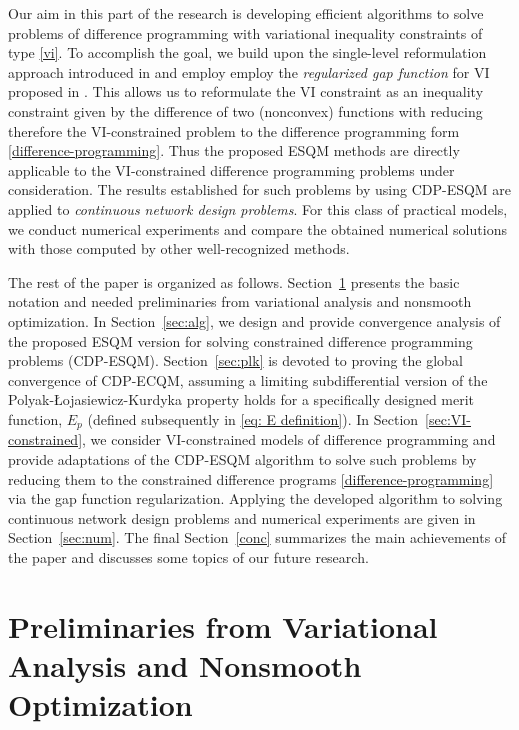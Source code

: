 \documentclass[11pt,a4paper]{article}
\theoremstyle{plain}
\begin{document}
Our aim in this part of the research is developing efficient algorithms to solve problems of difference programming with variational inequality constraints of type \eqref{vi}. To accomplish the goal, 
we build upon the single-level reformulation approach introduced in \cite{marcotte1996exact} and employ employ the {\em regularized gap function} for VI proposed in \cite{fukushima1992equivalent}.
This allows us to reformulate the VI constraint as an inequality constraint given by the difference of two (nonconvex) functions with reducing therefore the VI-constrained problem to the difference programming form \eqref{difference-programming}. Thus the proposed ESQM methods are directly applicable to the VI-constrained difference programming problems under consideration. The results established for such problems by using CDP-ESQM are applied to {\em continuous network design problems}. For this class of practical models, we conduct numerical experiments and compare the obtained numerical solutions with those computed by other well-recognized methods.\vspace*{0.03in}

The rest of the paper is organized as follows. 
Section~\ref{sec:preliminaries} presents the basic notation and needed preliminaries from variational analysis and nonsmooth optimization. In Section~\ref{sec:alg}, we design and provide convergence analysis of the proposed ESQM version for solving constrained difference programming problems (CDP-ESQM). Section~\ref{sec:plk} is devoted to proving the global convergence of CDP-ECQM, assuming a limiting subdifferential version of the Polyak-\L ojasiewicz-Kurdyka property holds for a specifically designed merit function, $E_{p}$ (defined subsequently in \eqref{eq: E definition}).
In Section~\ref{sec:VI-constrained}, we consider VI-constrained models of difference programming and provide adaptations of the CDP-ESQM algorithm to solve such problems by reducing them to the constrained difference programs \eqref{difference-programming} via the gap function regularization. Applying the developed algorithm to solving continuous network design problems  and numerical experiments are given in Section~\ref{sec:num}. The final Section~\ref{conc} summarizes the main achievements of the paper and discusses some topics of our future research.

\section{Preliminaries from Variational Analysis and Nonsmooth Optimization} \label{sec:preliminaries}
\setcounter{equation}{0}
\end{document}
